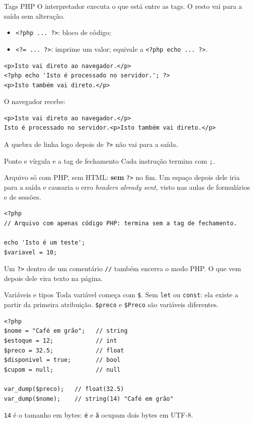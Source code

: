 \documentclass{beamer}
\begin{document}
\begin{frame}[fragile]{Tags PHP}
	O interpretador executa o que está entre as tags. O resto vai para a saída
	sem alteração.

	\vspace{0.2cm}
	\begin{itemize}
		\item \texttt{<?php ... ?>}: bloco de código;
		\item \texttt{<?= ... ?>}: imprime um valor; equivale a
		      \texttt{<?php echo ... ?>}.
	\end{itemize}

	\begin{verbatim}
<p>Isto vai direto ao navegador.</p>
<?php echo 'Isto é processado no servidor.'; ?>
<p>Isto também vai direto.</p>
	\end{verbatim}

	O navegador recebe:

	\begin{verbatim}
<p>Isto vai direto ao navegador.</p>
Isto é processado no servidor.<p>Isto também vai direto.</p>
	\end{verbatim}

	A quebra de linha logo depois de \texttt{?>} não vai para a saída.
\end{frame}

\begin{frame}[fragile]{Ponto e vírgula e a tag de fechamento}
	Cada instrução termina com \texttt{;}.

	\vspace{0.2cm}
	Arquivo só com PHP, sem HTML: \textbf{sem} \texttt{?>} no fim. Um espaço
	depois dele iria para a saída e causaria o erro \emph{headers already sent},
	visto nas aulas de formulários e de sessões.

	\begin{verbatim}
<?php
// Arquivo com apenas código PHP: termina sem a tag de fechamento.

echo 'Isto é um teste';
$variavel = 10;
	\end{verbatim}

	\vspace{0.2cm}
	Um \texttt{?>} dentro de um comentário \texttt{//} também encerra o modo
	PHP. O que vem depois dele vira texto na página.
\end{frame}

\begin{frame}[fragile]{Variáveis e tipos}
	Toda variável começa com \texttt{\$}. Sem \texttt{let} ou \texttt{const}: ela
	existe a partir da primeira atribuição. \texttt{\$preco} e \texttt{\$Preco}
	são variáveis diferentes.

	\begin{verbatim}
<?php
$nome = "Café em grão";   // string
$estoque = 12;            // int
$preco = 32.5;            // float
$disponivel = true;       // bool
$cupom = null;            // null

var_dump($preco);   // float(32.5)
var_dump($nome);    // string(14) "Café em grão"
	\end{verbatim}

	\texttt{14} é o tamanho em bytes: \texttt{é} e \texttt{ã} ocupam dois bytes
	em UTF-8.
\end{frame}
\end{document}
